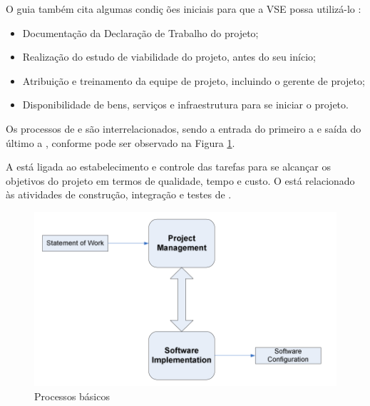 O guia também cita algumas condiç	ões iniciais para que a VSE possa utilizá-lo \citep{iso}:

\begin{itemize}

\item Documentação da Declaração de Trabalho do projeto;

\item Realização do estudo de viabilidade do projeto, antes do seu início;

\item Atribuição e treinamento da equipe de projeto, incluindo o gerente de projeto;

\item Disponibilidade de bens, serviços e infraestrutura para se iniciar o projeto.

\end{itemize}

Os processos de \gp e \dsw são interrelacionados, sendo a entrada do primeiro a \dt e saída do último a \swcfg, conforme pode ser observado na Figura \ref{fig:gp:dsw}. 

A \gp está ligada ao estabelecimento e controle das tarefas para se alcançar os objetivos do projeto em termos de qualidade, tempo e custo. O \dsw está relacionado às atividades de construção, integração e testes de \sw.

\begin{figure}[!h]
\centering
\includegraphics[scale=0.3]{figuras/gp_desenv_sw.png}
\caption{Processos básicos \cite[pág. 12]{iso}}
\label{fig:gp:dsw}
\end{figure}

\section{\gp}

